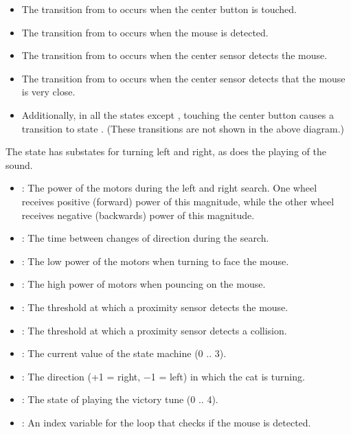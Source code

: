 \begin{itemize}

\item The transition from  to  occurs when
the center button is touched.

\item The transition from  to  occurs
when the mouse is detected.

\item The transition from  to  occurs
when the center sensor detects the mouse.

\item The transition from  to  occurs
when the center sensor detects that the mouse is very close.

\item Additionally, in all the states except , touching the
center button causes a transition to state . (These transitions
are not shown in the above diagram.)
\end{itemize}
The state  has substates for turning left and right, as does
the playing of the sound.


\begin{itemize}

\item {}: The power of the motors during the left and right search.
One wheel receives positive (forward) power of this magnitude, while the
other wheel receives negative (backwards) power of this magnitude.

\item {}: The time between changes of direction during the search.
\item {}: The low power of the motors when turning to face the mouse.
\item {}: The high power of motors when pouncing on the mouse.
\item {}: The threshold at which a proximity sensor detects the mouse.
\item {}: The threshold at which a proximity sensor detects a collision.
\end{itemize}


\begin{itemize}
\item {}: The current value of the state machine (0 .. 3). 
\item {}: The direction (+1 = right, $-$1 = left) in which the cat is turning.
\item {}: The state of playing the victory tune (0 .. 4).
\item {}: An index variable for the loop that checks if the mouse is detected.

\end{itemize}

